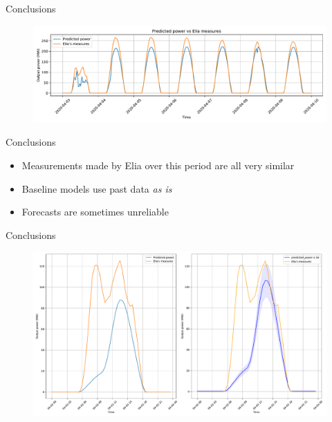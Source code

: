 \documentclass[12pt]{beamer}
\begin{document}
\begin{frame}{Conclusions}
    \begin{figure}
    \centering
    \includegraphics[width=\textwidth]{resources/pdf/province_naive (03-04-2020).pdf}
    \label{fig:prior_model}
\end{figure}
\end{frame}

\begin{frame}{Conclusions}
    \begin{itemize}
        \item \alert{Measurements} made by Elia over this period are all very \alert{similar}
        \item Baseline models \alert{use} past data \emph{as is}
        \item \alert{Forecasts} are sometimes \alert{unreliable}
    \end{itemize}
\end{frame}

\begin{frame}{Conclusions}
    \begin{figure}[H]
    \centering
    \includegraphics[width=\textwidth]{resources/pdf/comparison_naive_posterior (27-03-2020).pdf}
    \label{fig:naive_posterior_3_april}
\end{figure}
\end{frame}
\end{document}
